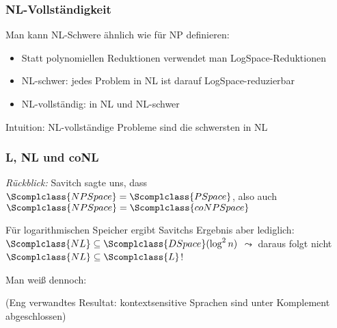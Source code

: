 \documentclass[aspectratio=1610,onlymath]{beamer}
\begin{document}
\begin{frame}\frametitle{NL-Vollständigkeit}

Man kann NL-Schwere ähnlich wie für NP definieren:
\begin{itemize}
\item Statt polynomiellen Reduktionen verwendet man LogSpace-Reduktionen
\item NL-schwer: jedes Problem in NL ist darauf LogSpace-reduzierbar
\item NL-vollständig: in NL und NL-schwer
\end{itemize}
Intuition: NL-vollständige Probleme sind die schwersten in NL
\bigskip\pause

\bigskip\pause

\end{frame}

\begin{frame}\frametitle{L, NL und coNL}

\emph{Rückblick:} Savitch sagte uns, dass $\Scomplclass{NPSpace}=\Scomplclass{PSpace}$, also auch $\Scomplclass{NPSpace}=\Scomplclass{coNPSpace}$
\bigskip\pause

Für logarithmischen Speicher ergibt Savitchs Ergebnis aber lediglich: $\Scomplclass{NL}\subseteq\Scomplclass{DSpace}(\log^2 n)$
$\leadsto$ daraus folgt nicht $\Scomplclass{NL}\subseteq\Scomplclass{L}$!
\bigskip\pause

Man weiß dennoch:\bigskip

\pause\medskip

\bigskip

{\tiny
(Eng verwandtes Resultat: kontextsensitive Sprachen sind unter Komplement abgeschlossen)

}

\end{frame}

\end{document}

